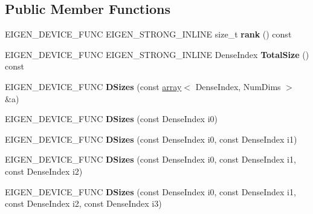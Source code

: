 \subsection*{Public Member Functions}
\begin{DoxyCompactItemize}
\item 
\mbox{\label{struct_eigen_1_1_d_sizes_aa9856dffd1c7d66b27a208280bd09d22}} 
E\+I\+G\+E\+N\+\_\+\+D\+E\+V\+I\+C\+E\+\_\+\+F\+U\+NC E\+I\+G\+E\+N\+\_\+\+S\+T\+R\+O\+N\+G\+\_\+\+I\+N\+L\+I\+NE size\+\_\+t {\bfseries rank} () const
\item 
\mbox{\label{struct_eigen_1_1_d_sizes_aaa880c9fd53051ef158094e1e529e1f0}} 
E\+I\+G\+E\+N\+\_\+\+D\+E\+V\+I\+C\+E\+\_\+\+F\+U\+NC E\+I\+G\+E\+N\+\_\+\+S\+T\+R\+O\+N\+G\+\_\+\+I\+N\+L\+I\+NE Dense\+Index {\bfseries Total\+Size} () const
\item 
\mbox{\label{struct_eigen_1_1_d_sizes_a2406350b7540a8952c2f0622e4295ef5}} 
E\+I\+G\+E\+N\+\_\+\+D\+E\+V\+I\+C\+E\+\_\+\+F\+U\+NC {\bfseries D\+Sizes} (const \hyperlink{class_eigen_1_1array}{array}$<$ Dense\+Index, Num\+Dims $>$ \&a)
\item 
\mbox{\label{struct_eigen_1_1_d_sizes_a3a9bcb4c74aaae3af0dd27701c1ba6ad}} 
E\+I\+G\+E\+N\+\_\+\+D\+E\+V\+I\+C\+E\+\_\+\+F\+U\+NC {\bfseries D\+Sizes} (const Dense\+Index i0)
\item 
\mbox{\label{struct_eigen_1_1_d_sizes_a301261808ad4fef4f1f3f93be884ca52}} 
E\+I\+G\+E\+N\+\_\+\+D\+E\+V\+I\+C\+E\+\_\+\+F\+U\+NC {\bfseries D\+Sizes} (const Dense\+Index i0, const Dense\+Index i1)
\item 
\mbox{\label{struct_eigen_1_1_d_sizes_accbad3b5f8b23e7b1db8471ba448d6bb}} 
E\+I\+G\+E\+N\+\_\+\+D\+E\+V\+I\+C\+E\+\_\+\+F\+U\+NC {\bfseries D\+Sizes} (const Dense\+Index i0, const Dense\+Index i1, const Dense\+Index i2)
\item 
\mbox{\label{struct_eigen_1_1_d_sizes_a1df542d8f562f46561afe36d18514e10}} 
E\+I\+G\+E\+N\+\_\+\+D\+E\+V\+I\+C\+E\+\_\+\+F\+U\+NC {\bfseries D\+Sizes} (const Dense\+Index i0, const Dense\+Index i1, const Dense\+Index i2, const Dense\+Index i3)

\end{DoxyCompactItemize}
